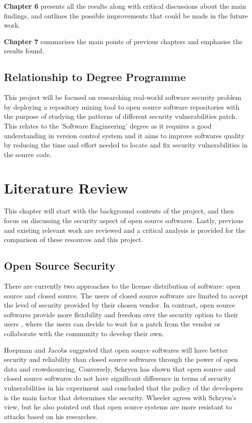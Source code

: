 \documentclass[12pt, a4paper]{report}
\begin{document}
\noindent\textbf{Chapter 6} presents all the results along with critical discussions about the main
findings,	and outlines the possible improvements that could be made in the future work.

\noindent\textbf{Chapter 7} summarises the main points of previous chapters and emphasise the
results found.

\section{Relationship to Degree Programme}
This project will be focused on researching real-world software security problem by deploying a
repository mining tool to open source software repositories with the purpose of studying the
patterns of different security vulnerabilities patch. This relates to the 'Software Engineering'
degree as it requires a good understanding in version control system and it aims to improve
softwares quality by reducing the time and effort needed to locate and fix security vulnerabilities
in the source code.

\chapter{Literature Review}
This chapter will start with the background contents of the project, and then focus on discussing
the security aspect of open source softwares. Lastly, previous and existing relevant work are
reviewed and a critical analysis is provided for the comparison of these resources and this project.

\section{Open Source Security}
There are currently two approaches to the license distribution of software: open source and closed
source. The users of closed source software are limited to accept the level of security
provided by their chosen vendor. In contrast, open source softwares provide more flexibility and
freedom over the security option to their users \cite{payne_2002}, where the users can decide to
wait for a patch from the vendor or collaborate with the community to develop their own.

Hoepman and Jacobs \cite{hoepman_2007} suggested that open source softwares will have better
security and reliability than closed source softwares through the power of open data and
crowdsourcing. Conversely, Schryen \cite{schryen_2011} has shown that open source and closed source
softwares do not have significant difference in terms of security vulnerabilities in his experiment
and concluded that the policy of the developers is the main factor that determines the security.
Wheeler \cite{wheeler_2015} agrees with Schryen's view, but he also pointed out that open source
systems are more resistant to attacks based on his researches.
\end{document}
